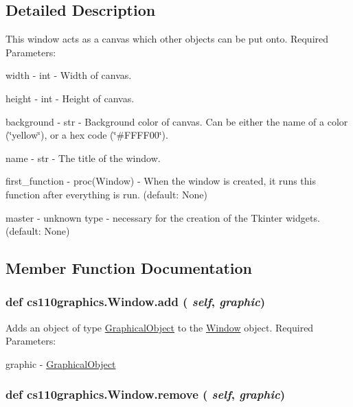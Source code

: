 \subsection{Detailed Description}
This window acts as a canvas which other objects can be put onto. Required Parameters:
\begin{DoxyItemize}
\item width -\/ int -\/ Width of canvas.
\item height -\/ int -\/ Height of canvas.
\item background -\/ str -\/ Background color of canvas. Can be either the name of a color (\char`\"{}yellow\char`\"{}), or a hex code (\char`\"{}\#FFFF00\char`\"{}).
\item name -\/ str -\/ The title of the window.
\item first\_\-function -\/ proc(Window) -\/ When the window is created, it runs this function after everything is run. (default: None)
\item master -\/ unknown type -\/ necessary for the creation of the Tkinter widgets. (default: None) 
\end{DoxyItemize}

\subsection{Member Function Documentation}
\hypertarget{classcs110graphics_1_1Window_a34064de02d5149841a23764e78085d18}{
\subsubsection[{add}]{\setlength{\rightskip}{0pt plus 5cm}def cs110graphics.Window.add ( {\em self}, \/   {\em graphic})}}
\label{classcs110graphics_1_1Window_a34064de02d5149841a23764e78085d18}


Adds an object of type \hyperlink{classcs110graphics_1_1GraphicalObject}{GraphicalObject} to the \hyperlink{classcs110graphics_1_1Window}{Window} object. Required Parameters:
\begin{DoxyItemize}
\item graphic -\/ \hyperlink{classcs110graphics_1_1GraphicalObject}{GraphicalObject} 
\end{DoxyItemize}\hypertarget{classcs110graphics_1_1Window_a14aba875d32f8a70a0c5a80ac3f18a92}{
\subsubsection[{remove}]{\setlength{\rightskip}{0pt plus 5cm}def cs110graphics.Window.remove ( {\em self}, \/   {\em graphic})}}
\label{classcs110graphics_1_1Window_a14aba875d32f8a70a0c5a80ac3f18a92}


